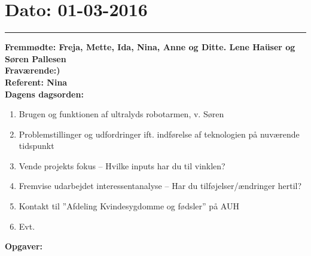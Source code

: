 \section{Dato: 01-03-2016}
\hrule
\textbf{Fremmødte: Freja, Mette, Ida, Nina, Anne og Ditte. Lene Haüser og Søren Pallesen} \\
\textbf{Fraværende:)} \\
\textbf{Referent: Nina } \\
\textbf{Dagens dagsorden: }
\begin{enumerate}
	\item Brugen og funktionen af ultralyds robotarmen, v. Søren
	\item Problemstillinger og udfordringer ift. indførelse af teknologien på nuværende tidspunkt 
	\item Vende projekts fokus – Hvilke inputs har du til vinklen?
	\item Fremvise udarbejdet interessentanalyse – Har du tilføjelser/ændringer hertil?
	\item Kontakt til ”Afdeling Kvindesygdomme og fødsler” på AUH
	\item Evt. 
\end{enumerate}

\textbf{Opgaver:} \newline

